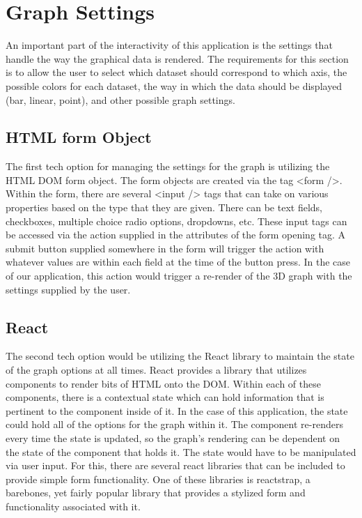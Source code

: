 \documentclass[letterpaper,10pt,titlepage, onecolumn]{IEEEtran}
\begin{document}
\section {Graph Settings}
An important part of the interactivity of this application is the settings that handle the way the graphical data is rendered. The requirements for this section is to allow the user to select which dataset should correspond to which axis, the possible colors for each dataset, the way in which the data should be displayed (bar, linear, point), and other possible graph settings.

\subsection{HTML form Object}
The first tech option for managing the settings for the graph is utilizing the HTML DOM form object. The form objects are created via the tag <form />. Within the form, there are several <input /> tags that can take on various properties based on the type that they are given. There can be text fields, checkboxes, multiple choice radio options, dropdowns, etc. These input tags can be accessed via the action supplied in the attributes of the form opening tag. A submit button supplied somewhere in the form will trigger the action with whatever values are within each field at the time of the button press. In the case of our application, this action would trigger a re-render of the 3D graph with the settings supplied by the user.

\subsection{React}
The second tech option would be utilizing the React library to maintain the state of the graph options at all times. React provides a library that utilizes components to render bits of HTML onto the DOM. Within each of these components, there is a contextual state which can hold information that is pertinent to the component inside of it. In the case of this application, the state could hold all of the options for the graph within it. The component re-renders every time the state is updated, so the graph’s rendering can be dependent on the state of the component that holds it. The state would have to be manipulated via user input. For this, there are several react libraries that can be included to provide simple form functionality. One of these libraries is reactstrap, a barebones, yet fairly popular library that provides a stylized form and functionality associated with it.
\end{document}
